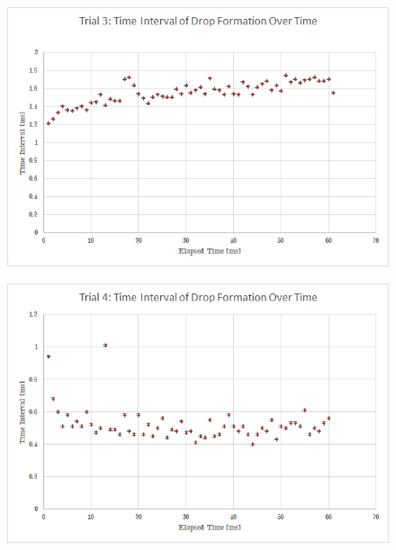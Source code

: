 \documentclass[a4paper]{article}
\begin{document}
\begin{figure}[H]
\centering
\begin{minipage}{.5\textwidth}
  \centering
  \includegraphics[width=\linewidth]{sink3.png}
  \label{fig:test1}
\end{minipage}%
\begin{minipage}{.5\textwidth}
  \centering
  \includegraphics[width=\linewidth]{sink4.png}
  \label{fig:test2}
\end{minipage}
\end{figure}
\end{document}
